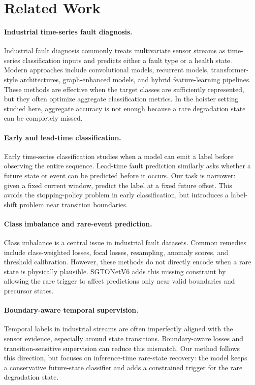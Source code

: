 \section{Related Work}
\label{sec:related}

\paragraph{Industrial time-series fault diagnosis.}
Industrial fault diagnosis commonly treats multivariate sensor streams as time-series classification inputs and predicts either a fault type or a health state. Modern approaches include convolutional models, recurrent models, transformer-style architectures, graph-enhanced models, and hybrid feature-learning pipelines. These methods are effective when the target classes are sufficiently represented, but they often optimize aggregate classification metrics. In the hoister setting studied here, aggregate accuracy is not enough because a rare degradation state can be completely missed.

\paragraph{Early and lead-time classification.}
Early time-series classification studies when a model can emit a label before observing the entire sequence. Lead-time fault prediction similarly asks whether a future state or event can be predicted before it occurs. Our task is narrower: given a fixed current window, predict the label at a fixed future offset. This avoids the stopping-policy problem in early classification, but introduces a label-shift problem near transition boundaries.

\paragraph{Class imbalance and rare-event prediction.}
Class imbalance is a central issue in industrial fault datasets. Common remedies include class-weighted losses, focal losses, resampling, anomaly scores, and threshold calibration. However, these methods do not directly encode when a rare state is physically plausible. SGTONetV6 adds this missing constraint by allowing the rare trigger to affect predictions only near valid boundaries and precursor states.

\paragraph{Boundary-aware temporal supervision.}
Temporal labels in industrial streams are often imperfectly aligned with the sensor evidence, especially around state transitions. Boundary-aware losses and transition-sensitive supervision can reduce this mismatch. Our method follows this direction, but focuses on inference-time rare-state recovery: the model keeps a conservative future-state classifier and adds a constrained trigger for the rare degradation state.
